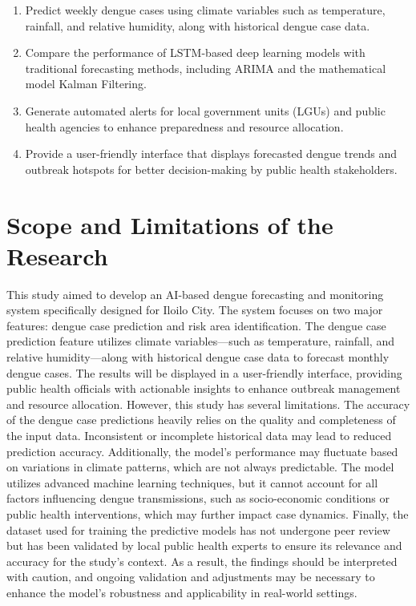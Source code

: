 \begin{enumerate}
   \item Predict weekly dengue cases using climate variables such as temperature, rainfall, and relative humidity, along with historical dengue case data.
   \item Compare the performance of LSTM-based deep learning models with traditional forecasting methods, including ARIMA and the mathematical model Kalman Filtering.
   \item Generate automated alerts for local government units (LGUs) and public health agencies to enhance preparedness and resource allocation.
   \item Provide a user-friendly interface that displays forecasted dengue trends and outbreak hotspots for better decision-making by public health stakeholders.
\end{enumerate}


\section{Scope and Limitations of the Research}
\label{sec:scopelimitations}

This study aimed to develop an AI-based dengue forecasting and monitoring system specifically designed for Iloilo City. The system focuses on two major features: dengue case prediction and risk area identification. The dengue case prediction feature utilizes climate variables—such as temperature, rainfall, and relative humidity—along with historical dengue case data to forecast monthly dengue cases. The results will be displayed in a user-friendly interface, providing public health officials with actionable insights to enhance outbreak management and resource allocation.
However, this study has several limitations. The accuracy of the dengue case predictions heavily relies on the quality and completeness of the input data. Inconsistent or incomplete historical data may lead to reduced prediction accuracy. Additionally, the model’s performance may fluctuate based on variations in climate patterns, which are not always predictable.
The model utilizes advanced machine learning techniques, but it cannot account for all factors influencing dengue transmissions, such as socio-economic conditions or public health interventions, which may further impact case dynamics.
Finally, the dataset used for training the predictive models has not undergone peer review but has been validated by local public health experts to ensure its relevance and accuracy for the study's context. As a result, the findings should be interpreted with caution, and ongoing validation and adjustments may be necessary to enhance the model's robustness and applicability in real-world settings.


